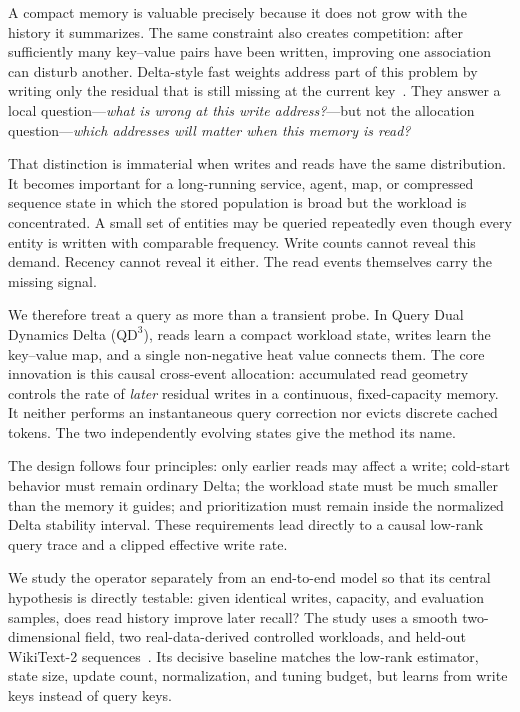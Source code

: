 \documentclass[pdflatex,sn-mathphys-num]{sn-jnl}
\theoremstyle{thmstyleone}
\newcommand{\QDDD}{\ensuremath{\mathrm{QD}^{3}}}
\begin{document}
A compact memory is valuable precisely because it does not grow with the history it summarizes. The same constraint also creates competition: after sufficiently many key--value pairs have been written, improving one association can disturb another. Delta-style fast weights address part of this problem by writing only the residual that is still missing at the current key~\cite{widrow1960,schlag2021}. They answer a local question---\emph{what is wrong at this write address?}---but not the allocation question---\emph{which addresses will matter when this memory is read?}

That distinction is immaterial when writes and reads have the same distribution. It becomes important for a long-running service, agent, map, or compressed sequence state in which the stored population is broad but the workload is concentrated. A small set of entities may be queried repeatedly even though every entity is written with comparable frequency. Write counts cannot reveal this demand. Recency cannot reveal it either. The read events themselves carry the missing signal.

We therefore treat a query as more than a transient probe. In Query Dual Dynamics Delta (\QDDD), reads learn a compact workload state, writes learn the key--value map, and a single non-negative heat value connects them. The core innovation is this causal cross-event allocation: accumulated read geometry controls the rate of \emph{later} residual writes in a continuous, fixed-capacity memory. It neither performs an instantaneous query correction nor evicts discrete cached tokens. The two independently evolving states give the method its name.

The design follows four principles: only earlier reads may affect a write; cold-start behavior must remain ordinary Delta; the workload state must be much smaller than the memory it guides; and prioritization must remain inside the normalized Delta stability interval. These requirements lead directly to a causal low-rank query trace and a clipped effective write rate.

We study the operator separately from an end-to-end model so that its central hypothesis is directly testable: given identical writes, capacity, and evaluation samples, does read history improve later recall? The study uses a smooth two-dimensional field, two real-data-derived controlled workloads, and held-out WikiText-2 sequences~\cite{merity2016wikitext}. Its decisive baseline matches the low-rank estimator, state size, update count, normalization, and tuning budget, but learns from write keys instead of query keys.
\end{document}
